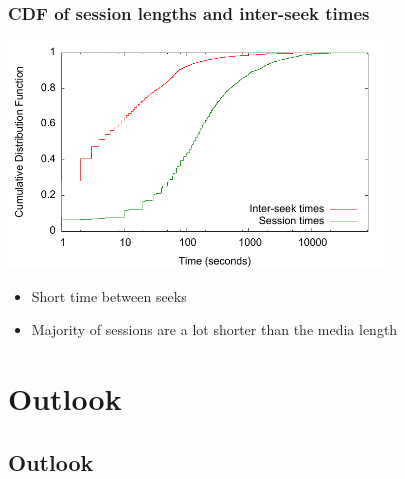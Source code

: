 \documentclass[xcolor=pdftex,dvipsnames,table]{beamer}
\begin{document}
\begin{frame}
    \frametitle{CDF of session lengths and inter-seek times}



    \includegraphics[width=10cm]{view_user_sessions_cdf}

    {\footnotesize
    \begin{itemize}
        \item {Short time between seeks}
        \item {Majority of sessions are a lot shorter than the media length}
    \end{itemize}
    }

\end{frame}

\section{Outlook}
\subsection{Outlook}
\end{document}
